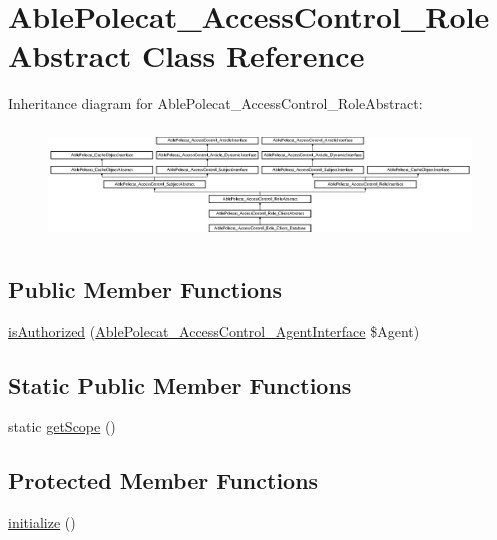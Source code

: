 \hypertarget{class_able_polecat___access_control___role_abstract}{}\section{Able\+Polecat\+\_\+\+Access\+Control\+\_\+\+Role\+Abstract Class Reference}
\label{class_able_polecat___access_control___role_abstract}
Inheritance diagram for Able\+Polecat\+\_\+\+Access\+Control\+\_\+\+Role\+Abstract\+:\begin{figure}[H]
\begin{center}
\leavevmode
\includegraphics[height=2.987805cm]{class_able_polecat___access_control___role_abstract}
\end{center}
\end{figure}
\subsection*{Public Member Functions}
\begin{DoxyCompactItemize}
\item 
\hyperlink{class_able_polecat___access_control___role_abstract_a544353080f75dc923ef2448de56ce63d}{is\+Authorized} (\hyperlink{interface_able_polecat___access_control___agent_interface}{Able\+Polecat\+\_\+\+Access\+Control\+\_\+\+Agent\+Interface} \$Agent)
\end{DoxyCompactItemize}
\subsection*{Static Public Member Functions}
\begin{DoxyCompactItemize}
\item 
static \hyperlink{class_able_polecat___access_control___role_abstract_ad9ade868bd136d32967059d1cccb3e92}{get\+Scope} ()
\end{DoxyCompactItemize}
\subsection*{Protected Member Functions}
\begin{DoxyCompactItemize}
\item 
\hyperlink{class_able_polecat___access_control___role_abstract_a91098fa7d1917ce4833f284bbef12627}{initialize} ()
\end{DoxyCompactItemize}


